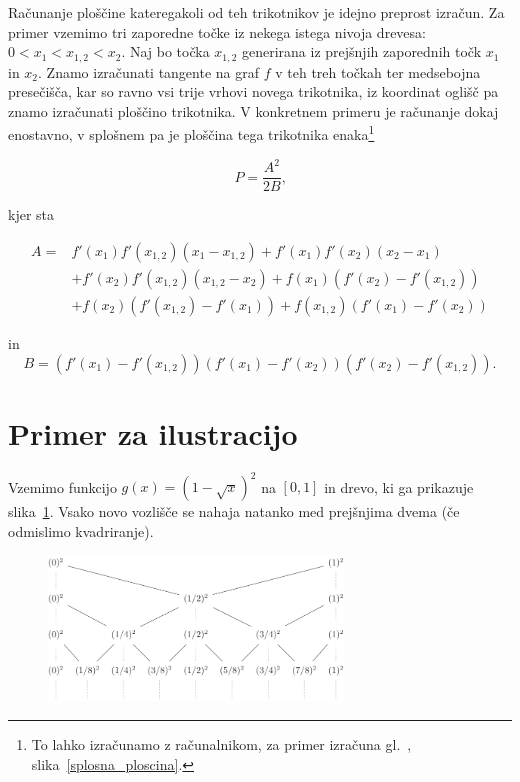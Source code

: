\documentclass[a4paper, 12pt, titlepage]{article}
\begin{document}
Računanje ploščine kateregakoli od teh trikotnikov je idejno preprost izračun. Za primer vzemimo tri zaporedne točke iz nekega istega nivoja drevesa: $ 0 < x_1 < x_{1,2} < x_2 $. Naj bo točka $ x_{1,2} $ generirana iz prejšnjih zaporednih točk $ x_1 $ in $ x_2 $. Znamo izračunati tangente na graf $ f $ v teh treh točkah ter medsebojna presečišča, kar so ravno vsi trije vrhovi novega trikotnika, iz koordinat oglišč pa znamo izračunati ploščino trikotnika. V konkretnem primeru je računanje dokaj enostavno, v splošnem pa je ploščina tega trikotnika enaka\footnote{To lahko izračunamo z računalnikom, za primer izračuna gl.~, slika~\ref{splosna_ploscina}.} 

\begin{equation}
    \label{splosna_ploscina_formula}
    P = \frac{A^2}{2B}\text{,}
\end{equation}

kjer sta

\begin{align*}
    A =  &f'(x_1)f'(x_{1,2})(x_1 - x_{1,2}) + f'(x_1)f'(x_2)(x_2 - x_1) \\
&+ f'(x_2)f'(x_{1,2})(x_{1,2} - x_2) + f(x_1)(f'(x_2) - f'(x_{1,2})) \\
&+ f(x_2)(f'(x_{1,2}) - f'(x_1)) + f(x_{1,2})(f'(x_1) - f'(x_2))
\end{align*}

in
$$
B = (f'(x_1) - f'(x_{1,2}))(f'(x_1) - f'(x_2))(f'(x_2) - f'(x_{1,2}))\text{.}
$$


\section{Primer za ilustracijo} \label{ilustrativen_primer}

Vzemimo funkcijo $ g(x) = (1 - \sqrt{x})^2 $ na $ [0, 1] $ in drevo, ki ga prikazuje slika~\ref{ilustrativen_primer_drevo}. Vsako novo vozlišče se nahaja natanko med prejšnjima dvema (če odmislimo kvadriranje).

\begin{figure}[h!]
    \centering
    \includegraphics[width=0.7\textwidth]{slike/ilustrativen_primer_drevo.png}
    \caption{}
    \label{ilustrativen_primer_drevo}
\end{figure}
\end{document}
